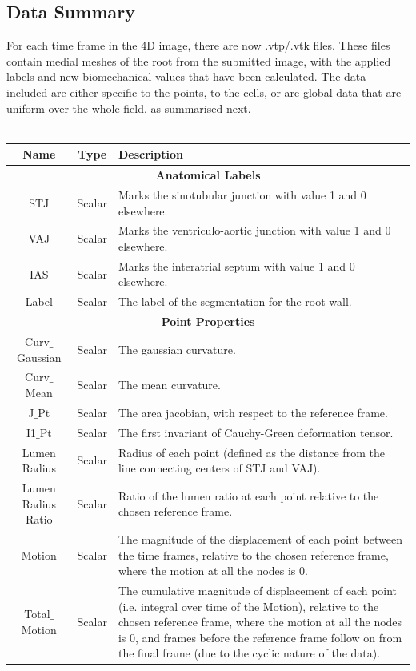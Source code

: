 \documentclass{article}
\begin{document}
\subsection*{Data Summary}
For each time frame in the 4D image, there are now .vtp/.vtk files. These files contain medial meshes of the root from the submitted image, with the applied labels and new biomechanical values that have been calculated. The data included are either specific to the points, to the cells, or are global data that are uniform over the whole field, as summarised next.
\\
~
\\
\begin{tabular}{|c|c|p{9.4cm}|}
	\hline
\textbf{Name}	& \textbf{Type} & \textbf{Description}   \\
	\hline
	\hline
	\multicolumn{3}{|c|}{\textbf{Anatomical Labels}} \\
	\hline
STJ	& Scalar  & Marks the sinotubular junction with value 1 and 0 elsewhere.  \\
	\hline
VAJ	& Scalar &  Marks the ventriculo-aortic junction with value 1 and 0 elsewhere.  \\
	\hline 
IAS	&Scalar &Marks the interatrial septum with value 1 and 0 elsewhere. \\
	\hline
Label	& Scalar & The label of the segmentation for the root wall.\\
\hline
\hline
\multicolumn{3}{|c|}{\textbf{Point Properties}} \\
	\hline
Curv$\_$Gaussian	& Scalar& The gaussian curvature.\\
\hline
Curv$\_$Mean	& Scalar& The mean curvature.\\
	\hline
J$\_$Pt	& Scalar& The area jacobian, with respect to the reference frame.\\
	\hline
I1$\_$Pt& Scalar & The first invariant of Cauchy-Green deformation tensor. \\
	\hline
Lumen Radius & Scalar& Radius of each point (defined as the distance from the line connecting centers of STJ and VAJ).\\
	\hline
Lumen Radius Ratio & Scalar& Ratio of the lumen ratio at each point relative to the chosen reference frame.\\
	\hline
Motion	& Scalar& The magnitude of the displacement of each point between the time frames, relative to the chosen reference frame, where the motion at all the nodes is 0.\\
	\hline
Total$\_$Motion	& Scalar& The cumulative magnitude of displacement of each point (i.e. integral over time of the Motion), relative to the chosen reference frame, where the motion at all the nodes is 0, and frames before the reference frame follow on from the final frame (due to the cyclic nature of the data).\\

\end{tabular}
\end{document}
